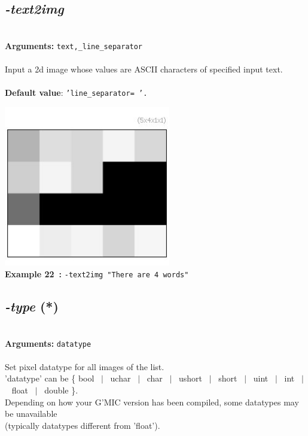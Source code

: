 \documentclass[a4paper,11pt,twoside]{book}
\begin{document}
\subsection{\emph{-text2img} }\vspace*{-0.5em}
~\\\textbf{Arguments: } 
{\small \texttt{text,\_line\_separator}}\\~\\
Input a 2d image whose values are ASCII characters of specified input text.
~\\~\\\textbf{Default value}: {\small \texttt{'line\_separator= '.}}
\begin{center}\includegraphics[keepaspectratio=true,height=7cm,width=\textwidth]{img/gmic_def22.jpg}\\
{\footnotesize \textbf{Example 22~:} \texttt{-text2img "There are 4 words"}}
\end{center}

\subsection{\emph{-type} (*)}\vspace*{-0.5em}
~\\\textbf{Arguments: } 
{\small \texttt{datatype}}\\~\\
Set pixel datatype for all images of the list.
~\\'datatype' can be \{ bool ~$|$~ uchar ~$|$~ char ~$|$~ ushort ~$|$~ short ~$|$~ uint ~$|$~ int ~$|$~ float ~$|$~ double \}.
~\\Depending on how your G'MIC version has been compiled, some datatypes may be unavailable
~\\(typically datatypes different from 'float').
\end{document}
